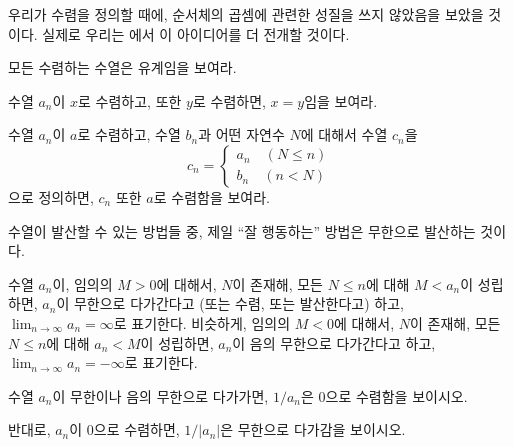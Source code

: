 \begin{remark}
    우리가 수렴을 정의할 때에, 순서체의 곱셈에 관련한 성질을 쓰지 않았음을 보았을 것이다.
    실제로 우리는 에서 이 아이디어를 더 전개할 것이다.
\end{remark}
\begin{exercise}
    모든 수렴하는 수열은 유계임을 보여라.
\end{exercise}
\begin{exercise}
    수열 $a_n$이 $x$로 수렴하고, 또한 $y$로 수렴하면, $x = y$임을 보여라.
\end{exercise}
\begin{exercise}
    수열 $a_n$이 $a$로 수렴하고, 수열 $b_n$과 어떤 자연수 $N$에 대해서 수열 $c_n$을
    \begin{equation*}
        c_n = \begin{cases}
            a_n \quad (N \leq n) \\
            b_n \quad (n < N)
        \end{cases}
    \end{equation*}
    으로 정의하면, $c_n$ 또한 $a$로 수렴함을 보여라.
\end{exercise}

수열이 발산할 수 있는 방법들 중, 제일 ``잘 행동하는'' 방법은 무한으로 발산하는 것이다.
\begin{definition}
\label{def:convergeinfty}
    수열 $a_n$이, 임의의 $M > 0$에 대해서, $N$이 존재해, 모든 $N \leq n$에 대해 $M < a_n$이 성립하면, $a_n$이 무한으로 다가간다고 (또는 수렴, 또는 발산한다고) 하고, $\lim_{n \to \infty} a_n = \infty$로 표기한다.
    비슷하게, 임의의 $M < 0$에 대해서, $N$이 존재해, 모든 $N \leq n$에 대해 $a_n < M$이 성립하면, $a_n$이 음의 무한으로 다가간다고 하고, $\lim_{n \to \infty} a_n = -\infty$로 표기한다.
\end{definition}
\begin{exercise}
    수열 $a_n$이 무한이나 음의 무한으로 다가가면, $1/a_n$은 $0$으로 수렴함을 보이시오.
\end{exercise}
\begin{exercise}
    반대로, $a_n$이 $0$으로 수렴하면, $1/|a_n|$은 무한으로 다가감을 보이시오.
\end{exercise}

